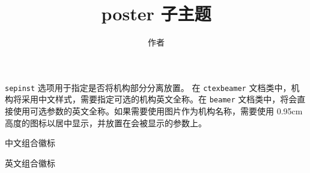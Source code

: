 \documentclass{ctexbeamer}
\begin{document}
    \title{poster 子主题}
    \author{作者}
    \begin{frame}[fragile]
        \texttt{sepinst} 选项用于指定是否将机构部分分离放置。
        在 \texttt{ctexbeamer} 文档类中，机构将采用中文样式，需要指定可选的机构英文全称。在 \texttt{beamer} 文档类中，将会直接使用可选参数的英文全称。如果需要使用图片作为机构名称，需要使用 0.95cm 高度的图标以居中显示，并放置在会被显示的参数上。
        
        \begin{codeblock}[]{中文组合徽标}
\institute[]{\resizebox{!}{0.95cm}{\zhlogo}}
        \end{codeblock}

        \secondaryinstlogo[]{\resizebox{!}{0.95cm}{\zhlogo}}{\sjtubadge}
        
        \begin{codeblock}[]{英文组合徽标}
\institute[\resizebox{!}{0.95cm}{\enlogo}]{}
        \end{codeblock}

        \secondaryinstlogo{\resizebox{!}{0.95cm}{\enlogo}}{\sjtubadge}
        
    \end{frame}
\end{document}
